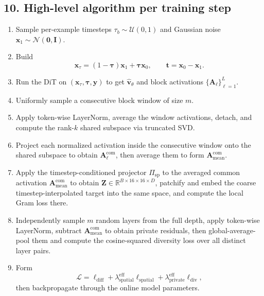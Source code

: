 \documentclass[11pt]{article}
\begin{document}
\subsection*{10. High-level algorithm per training step}
\begin{enumerate}
  \item Sample per-example timesteps $\tau_b\sim\mathcal{U}(0,1)$ and Gaussian noise $\bm{x}_1\sim\mathcal{N}(\bm{0},\bm{I})$.
  \item Build
  \[
    \bm{x}_\tau = (1-\bm{\tau})\bm{x}_1 + \bm{\tau}\bm{x}_0,
    \qquad
    \bm{t} = \bm{x}_0 - \bm{x}_1.
  \]
  \item Run the DiT on $(\bm{x}_\tau,\bm{\tau},\bm{y})$ to get $\hat{\bm{v}}_\theta$ and block activations $\{\bm{A}_\ell\}_{\ell=1}^{L}$.
  \item Uniformly sample a consecutive block window of size $m$.
  \item Apply token-wise LayerNorm, average the window activations, detach, and compute the rank-$k$ shared subspace via truncated SVD.
  \item Project each normalized activation inside the consecutive window onto the shared subspace to obtain $\bm{A}^{\mathrm{com}}_\ell$, then average them to form $\bm{A}^{\mathrm{com}}_{\mathrm{mean}}$.
  \item Apply the timestep-conditioned projector $\Pi_{\mathrm{sp}}$ to the averaged common activation $\bm{A}^{\mathrm{com}}_{\mathrm{mean}}$ to obtain $\bm{Z}\in\mathbb{R}^{B\times 16\times 16\times D}$, patchify and embed the coarse timestep-interpolated target into the same space, and compute the local Gram loss there.
  \item Independently sample $m$ random layers from the full depth, apply token-wise LayerNorm, subtract $\bm{A}^{\mathrm{com}}_{\mathrm{mean}}$ to obtain private residuals, then global-average-pool them and compute the cosine-squared diversity loss over all distinct layer pairs.
  \item Form
  \[
    \mathcal{L}
    =
    \ell_{\mathrm{diff}}
    +
    \lambda_{\mathrm{spatial}}^{\mathrm{eff}} \ell_{\mathrm{spatial}}
    +
    \lambda_{\mathrm{private}}^{\mathrm{eff}} \ell_{\mathrm{div}},
  \]
  then backpropagate through the online model parameters.
\end{enumerate}
\end{document}
